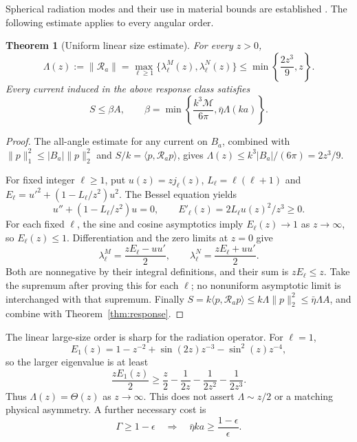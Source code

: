 \documentclass[11pt]{article}
\newtheorem{theorem}{Theorem}[section]
\newcommand{\ip}[2]{\langle #1,#2\rangle}
\newcommand{\norm}[1]{\lVert #1\rVert}
\newcommand{\abs}[1]{\lvert #1\rvert}
\begin{document}
Spherical radiation modes and their use in material bounds are established \citep{Gustafsson2020,Kuang2020,Gustafsson2024}. The following estimate applies to every angular order.
\begin{theorem}[Uniform linear size estimate]\label{thm:linear}
For every $z>0$,
\begin{equation}\label{eq:lambda-bound}
 \Lambda(z):=\norm{\mathcal R_a}
 =\max_{\ell\geq1}\{\lambda^M_\ell(z),\lambda^N_\ell(z)\}
 \leq\min\left\{\frac{2z^3}{9},z\right\}.
\end{equation}
Every current induced in the above response class satisfies
\begin{equation}\label{eq:efficiency}
 S\leq\beta A,\qquad
 \beta=\min\left\{\frac{k^3\mathcal M}{6\pi},\bar\eta\Lambda(ka)\right\}.
\end{equation}
\end{theorem}
\begin{proof}
The all-angle estimate for any current on $B_a$, combined with $\norm p_1^2\leq\abs{B_a}\norm p_2^2$ and $S/k=\ip p{\mathcal R_ap}$, gives $\Lambda(z)\leq k^3\abs{B_a}/(6\pi)=2z^3/9$.

For fixed integer $\ell\geq1$, put $u(z)=zj_\ell(z)$, $L_\ell=\ell(\ell+1)$ and $E_\ell=u'^2+(1-L_\ell/z^2)u^2$. The Bessel equation yields
\[
 u''+(1-L_\ell/z^2)u=0,\qquad E'_\ell(z)=2L_\ell u(z)^2/z^3\geq0.
\]
For each fixed $\ell$, the sine and cosine asymptotics imply $E_\ell(z)\to1$ as $z\to\infty$, so $E_\ell(z)\leq1$. Differentiation and the zero limits at $z=0$ give
\begin{equation}\label{eq:lambda-energy}
 \lambda^M_\ell=\frac{zE_\ell-uu'}{2},\qquad
 \lambda^N_\ell=\frac{zE_\ell+uu'}{2}.
\end{equation}
Both are nonnegative by their integral definitions, and their sum is $zE_\ell\leq z$. Take the supremum after proving this for each $\ell$; no nonuniform asymptotic limit is interchanged with that supremum. Finally $S=k\ip p{\mathcal R_ap}\leq k\Lambda\norm p_2^2\leq\bar\eta\Lambda A$, and combine with Theorem~\ref{thm:response}.
\end{proof}

The linear large-size order is sharp for the radiation operator. For $\ell=1$,
\[
 E_1(z)=1-z^{-2}+\sin(2z)z^{-3}-\sin^2(z)z^{-4},
\]
so the larger eigenvalue is at least
\[
 \frac{zE_1(z)}2\geq\frac z2-\frac1{2z}-\frac1{2z^2}-\frac1{2z^3}.
\]
Thus $\Lambda(z)=\Theta(z)$ as $z\to\infty$. This does not assert $\Lambda\sim z/2$ or a matching physical asymmetry. A further necessary cost is
\begin{equation}\label{eq:size-cost}
 \Gamma\geq1-\epsilon\quad\Longrightarrow\quad
 \bar\eta ka\geq\frac{1-\epsilon}{\epsilon}.
\end{equation}
\end{document}
